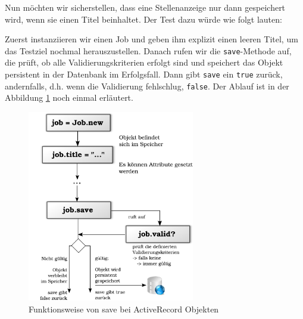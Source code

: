 Nun möchten wir sicherstellen, dass eine Stellenanzeige nur dann gespeichert wird, wenn sie einen Titel beinhaltet. Der Test dazu würde wie folgt lauten:

\begin{ruby}[label={test/units/job\_test.rb}]
 

   
    
      
      
     
\end{ruby}
\tddred
Zuerst instanziieren wir einen Job und geben ihm explizit einen leeren Titel, um das Testziel nochmal herauszustellen. Danach rufen wir die \texttt{save}-Methode auf, die prüft, ob alle Validierungskriterien erfolgt sind und speichert das Objekt persistent in der Datenbank im Erfolgsfall. Dann gibt \texttt{save} ein \texttt{true} zurück, andernfalls, d.h. wenn die Validierung fehlschlug, \texttt{false}.
Der Ablauf ist in der Abbildung \ref{fig:activerecordsave} noch einmal erläutert.

\begin{figure}[hbp]
 \centering
 \includegraphics[width=0.65\textwidth]{./diagrams/activerecord-save.pdf}
 \caption{Funktionsweise von save bei ActiveRecord Objekten}
 \label{fig:activerecordsave}
\end{figure}

